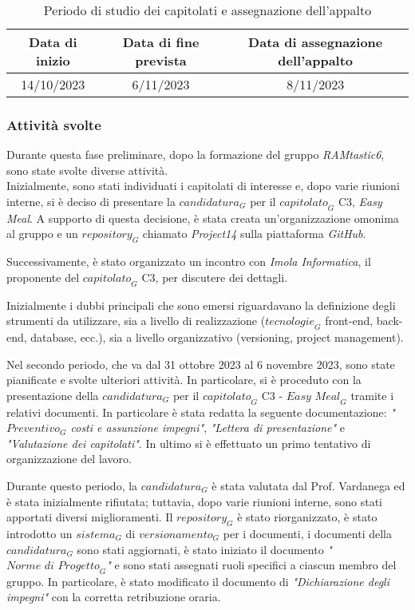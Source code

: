 \begin{table}[h]
\centering
\captionsetup{justification=centering}

\begin{tabular}{|c|c|c|}
\hline
\textbf{Data di inizio} & \textbf{Data di fine prevista} & \textbf{Data di assegnazione dell'appalto} \\
\hline
14/10/2023 & 6/11/2023 & 8/11/2023 \\
\hline
\end{tabular}
\caption{Periodo di studio dei capitolati e assegnazione dell'appalto}
\end{table}

\subsubsection{Attività svolte}
Durante questa fase preliminare, dopo la formazione del gruppo \emph{RAMtastic6}, sono state svolte diverse attività. \\
Inizialmente, sono stati individuati i capitolati di interesse e, dopo varie riunioni interne, si è deciso di presentare la $\textit{candidatura}_G$ per il $\textit{capitolato}_G$ C3, \emph{Easy Meal}. A supporto di questa decisione, è stata creata un'organizzazione omonima al gruppo e un $\textit{repository}_G$ chiamato \emph{Project14} sulla piattaforma \emph{GitHub}. 

Successivamente, è stato organizzato un incontro con \emph{Imola Informatica}, il proponente del $\textit{capitolato}_G$ C3, per discutere dei dettagli.

Inizialmente i dubbi principali che sono emersi riguardavano la definizione degli strumenti da utilizzare, sia a livello di realizzazione ($\textit{tecnologie}_G$ front-end, back-end, database, ecc.), sia a livello organizzativo (versioning, project management).

Nel secondo periodo, che va dal 31 ottobre 2023 al 6 novembre 2023, sono state pianificate e svolte ulteriori attività. In particolare, si è proceduto con la presentazione della $\textit{candidatura}_G$ per il $\textit{capitolato}_G$ C3 - $\textit{Easy Meal}_G$ tramite i relativi documenti. In particolare è stata redatta la seguente documentazione: \emph{"$\textit{Preventivo}_G$ costi e assunzione impegni"}, \emph{"Lettera di presentazione"} e \emph{"Valutazione dei capitolati"}. In ultimo si è effettuato un primo tentativo di organizzazione del lavoro.

Durante questo periodo, la $\textit{candidatura}_G$ è stata valutata dal Prof. Vardanega ed è stata inizialmente rifiutata; tuttavia, dopo varie riunioni interne, sono stati apportati diversi miglioramenti. Il $\textit{repository}_G$ è stato riorganizzato, è stato introdotto un $\textit{sistema}_G$ di $\textit{versionamento}_G$ per i documenti, i documenti della $\textit{candidatura}_G$ sono stati aggiornati, è stato iniziato il documento \emph{"$\textit{Norme di Progetto}_G$"} e sono stati assegnati ruoli specifici a ciascun membro del gruppo. In particolare, è stato modificato il documento di \emph{"Dichiarazione degli impegni"} con la corretta retribuzione oraria.

